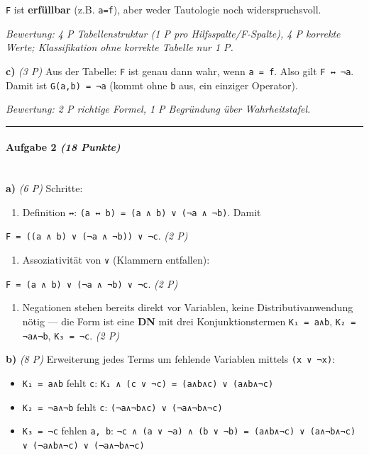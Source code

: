 \documentclass[11pt, a4paper]{article}
\begin{document}
\texttt{F} ist \textbf{erfüllbar} (z.B. \texttt{a=f}), aber weder Tautologie noch widerspruchsvoll.


\textit{Bewertung: 4 P Tabellenstruktur (1 P pro Hilfsspalte/F-Spalte), 4 P korrekte Werte; Klassifikation ohne korrekte Tabelle nur 1 P.}


\textbf{c)} \textit{(3 P)} Aus der Tabelle: \texttt{F} ist genau dann wahr, wenn \texttt{a = f}. Also gilt \texttt{F ↔ ¬a}. Damit ist \texttt{G(a,b) = ¬a} (kommt ohne \texttt{b} aus, ein einziger Operator).

\textit{Bewertung: 2 P richtige Formel, 1 P Begründung über Wahrheitstafel.}



\noindent\textcolor{rulegray}{\rule{\linewidth}{0.4pt}}


\paragraph{Aufgabe 2 \textit{(18 Punkte)}}\mbox{}\\[2pt]

\textbf{a)} \textit{(6 P)} Schritte:


\begin{enumerate}
  \item Definition \texttt{↔}: \texttt{(a ↔ b) = (a ∧ b) ∨ (¬a ∧ ¬b)}. Damit
\end{enumerate}
\texttt{F = ((a ∧ b) ∨ (¬a ∧ ¬b)) ∨ ¬c}. \textit{(2 P)}

\begin{enumerate}
  \item Assoziativität von \texttt{∨} (Klammern entfallen):
\end{enumerate}
\texttt{F = (a ∧ b) ∨ (¬a ∧ ¬b) ∨ ¬c}. \textit{(2 P)}

\begin{enumerate}
  \item Negationen stehen bereits direkt vor Variablen, keine Distributivanwendung nötig — die Form ist eine \textbf{DN} mit drei Konjunktionstermen \texttt{K₁ = a∧b}, \texttt{K₂ = ¬a∧¬b}, \texttt{K₃ = ¬c}. \textit{(2 P)}
\end{enumerate}

\textbf{b)} \textit{(8 P)} Erweiterung jedes Terms um fehlende Variablen mittels \texttt{(x ∨ ¬x)}:


\begin{itemize}
  \item \texttt{K₁ = a∧b} fehlt \texttt{c}: \texttt{K₁ ∧ (c ∨ ¬c) = (a∧b∧c) ∨ (a∧b∧¬c)}
  \item \texttt{K₂ = ¬a∧¬b} fehlt \texttt{c}: \texttt{(¬a∧¬b∧c) ∨ (¬a∧¬b∧¬c)}
  \item \texttt{K₃ = ¬c} fehlen \texttt{a, b}: \texttt{¬c ∧ (a ∨ ¬a) ∧ (b ∨ ¬b) = (a∧b∧¬c) ∨ (a∧¬b∧¬c) ∨ (¬a∧b∧¬c) ∨ (¬a∧¬b∧¬c)}
\end{itemize}
\end{document}
